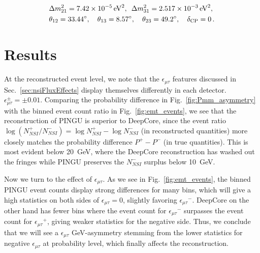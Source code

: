 \documentclass{revtex4-2}
\newcommand{\emt}{\ensuremath{\epsilon_{\mu\tau}}}
\newcommand{\dm}{\Delta m^2_{31}}
\newcommand{\Pmm}{P_{\mu\mu}}
\begin{document}
\begin{align}\label{eq:PINGUparams}
    &\Delta m^2_{21} =  \SI{7.42e-5}{\electronvolt^2},\hspace{0.5em} \dm =  \SI{2.517e-3}{\electronvolt^2}, \nonumber \\
    &\theta_{12} = \SI{33.44}{\degree},\hspace{1em} \theta_{13} = \SI{8.57}{\degree},\hspace{1em} \theta_{23} = \SI{49.2}{\degree}, \hspace{1em} \delta_\text{CP} = 0\,.
\end{align}

\section{Results}
At the reconstructed event level, we note that the $\emt$ features discussed in Sec.~\ref{sec:nsiFluxEffects} display themselves differently in each detector.
$\epsilon^\pm_{\mu\tau} = \pm 0.01$.
Comparing the probability difference in Fig.~\ref{fig:Pmm_asymmetry} with the binned event count ratio in Fig.~\ref{fig:emt_events}, we see that the reconstruction of PINGU is
superior to DeepCore, since the event ratio $\log{(N^+_{NSI}/N^-_{NSI})} = \log{N^+_{NSI}} - \log{N^-_{NSI}}$ (in reconstructed quantities) 
more closely matches the probability difference $P^+-P^-$ (in true quantities).
This is most evident below \SI{20}{\GeV}, where the DeepCore reconstruction has washed out the fringes while PINGU preserves the $N^-_{NSI}$ surplus below \SI{10}{\GeV}.

Now we turn to the effect of $\emt$. %
As we see in Fig.~\ref{fig:emt_events}, the binned PINGU event counts display strong differences for many bins, which will give a high statistics on both sides of $\emt=0$, slightly favoring $\emt^-$. 
DeepCore on the other hand has fewer bins where the event count for $\emt^-$ surpasses the event count for $\emt^+$, 
giving weaker statistics for the negative side. Thus, we conclude that we will see a $\emt$ \si{GeV}-asymmetry stemming from the lower statistics 
for negative $\emt$ at probability level, which finally affects the reconstruction.
\end{document}
